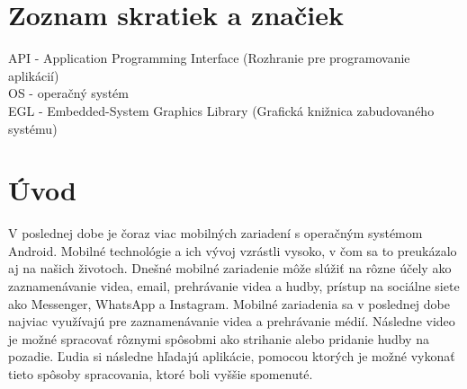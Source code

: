 \documentclass[12pt, oneside]{book}
\begin{document}














\tableofcontents
\thispagestyle{empty}

\newpage
\listoffigures{\protect\thispagestyle{empty}}
\listoftables{\protect\thispagestyle{empty}}
\newpage
\lstlistoflistings{\protect\thispagestyle{empty}}


\newpage

\chapter*{Zoznam skratiek a značiek}
\thispagestyle{empty}

API - Application Programming Interface (Rozhranie pre programovanie aplikácií)
\\
OS - operačný systém
\\
EGL - Embedded-System Graphics Library (Grafická knižnica zabudovaného systému)
\\



\newpage


\chapter*{Úvod}

\hspace{15pt} V poslednej dobe je čoraz viac mobilných zariadení s operačným systémom Android. Mobilné technológie a ich vývoj vzrástli vysoko, v čom sa to preukázalo aj na našich životoch. Dnešné mobilné zariadenie môže slúžiť na rôzne účely ako zaznamenávanie videa, email, prehrávanie videa a hudby, prístup na sociálne siete ako Messenger, WhatsApp a Instagram. Mobilné zariadenia sa v poslednej dobe najviac využívajú pre zaznamenávanie videa a prehrávanie médií. Následne video je možné spracovať rôznymi spôsobmi ako strihanie alebo pridanie hudby na pozadie. Ľudia si následne hľadajú aplikácie, pomocou ktorých je možné vykonať tieto spôsoby spracovania, ktoré boli vyššie spomenuté. 
\end{document}
